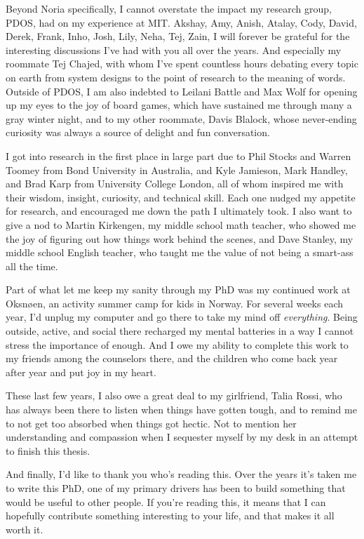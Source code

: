 Beyond Noria specifically, I cannot overstate the impact my research group,
PDOS, had on my experience at MIT. Akshay, Amy, Anish, Atalay, Cody, David,
Derek, Frank, Inho, Josh, Lily, Neha, Tej, Zain, I will forever be grateful for
the interesting discussions I've had with you all over the years. And especially
my roommate Tej Chajed, with whom I've spent countless hours debating every
topic on earth from system designs to the point of research to the meaning of
words. Outside of PDOS, I am also indebted to Leilani Battle and Max Wolf for
opening up my eyes to the joy of board games, which have sustained me through
many a gray winter night, and to my other roommate, Davis Blalock, whose
never-ending curiosity was always a source of delight and fun conversation.

I got into research in the first place in large part due to Phil Stocks and
Warren Toomey from Bond University in Australia, and Kyle Jamieson, Mark
Handley, and Brad Karp from University College London, all of whom inspired me
with their wisdom, insight, curiosity, and technical skill. Each one nudged my
appetite for research, and encouraged me down the path I ultimately took. I also
want to give a nod to Martin Kirkengen, my middle school math teacher, who
showed me the joy of figuring out how things work behind the scenes, and Dave
Stanley, my middle school English teacher, who taught me the value of not being
a smart-ass all the time.

Part of what let me keep my sanity through my PhD was my continued work at
Oksnøen, an activity summer camp for kids in Norway. For several weeks each
year, I'd unplug my computer and go there to take my mind off \emph{everything}.
Being outside, active, and social there recharged my mental batteries in a way I
cannot stress the importance of enough. And I owe my ability to complete this
work to my friends among the counselors there, and the children who come back
year after year and put joy in my heart.

These last few years, I also owe a great deal to my girlfriend, Talia Rossi, who
has always been there to listen when things have gotten tough, and to remind me
to not get too absorbed when things got hectic. Not to mention her understanding
and compassion when I sequester myself by my desk in an attempt to finish this
thesis.

And finally, I'd like to thank you who's reading this. Over the years it's taken
me to write this PhD, one of my primary drivers has been to build something that
would be useful to other people. If you're reading this, it means that I can
hopefully contribute something interesting to your life, and that makes it all
worth it.
